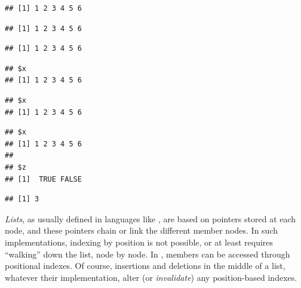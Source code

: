 \documentclass[krantz2]{krantz}\usepackage{knitr}
\begin{document}
\begin{knitrout}\footnotesize
{}\color{fgcolor}\begin{kframe}
\begin{alltt}
\hlopt{$}
\end{alltt}
\begin{verbatim}
## [1] 1 2 3 4 5 6
\end{verbatim}
\begin{alltt}
\hlstd{a.list[[}\hlstd{]]}
\end{alltt}
\begin{verbatim}
## [1] 1 2 3 4 5 6
\end{verbatim}
\begin{alltt}
\hlstd{a.list[[}\hlstd{]]}
\end{alltt}
\begin{verbatim}
## [1] 1 2 3 4 5 6
\end{verbatim}
\begin{alltt}
\hlstd{a.list[}\hlstd{]}
\end{alltt}
\begin{verbatim}
## $x
## [1] 1 2 3 4 5 6
\end{verbatim}
\begin{alltt}
\hlstd{a.list[}\hlstd{]}
\end{alltt}
\begin{verbatim}
## $x
## [1] 1 2 3 4 5 6
\end{verbatim}
\begin{alltt}
\hlstd{a.list[}\hlstd{(}\hlstd{,}\hlstd{)]}
\end{alltt}
\begin{verbatim}
## $x
## [1] 1 2 3 4 5 6
## 
## $z
## [1]  TRUE FALSE
\end{verbatim}
\begin{alltt}
\hlstd{(a.list[[}\hlstd{(}\hlstd{,}\hlstd{)]])}
\end{alltt}
\begin{verbatim}
## [1] 3
\end{verbatim}
\end{kframe}
\end{knitrout}

\begin{explainbox}
\emph{Lists}, as usually defined in languages like \Clang, are based on pointers stored at each node, and these pointers chain or link the different member nodes. In such implementations, indexing by position is not possible, or at least requires ``walking'' down the list, node by node. In \Rlang,  members can be accessed through positional indexes. Of course, insertions and deletions in the middle of a list, whatever their implementation, alter (or \emph{invalidate}) any position-based indexes.
\end{explainbox}
\end{document}
